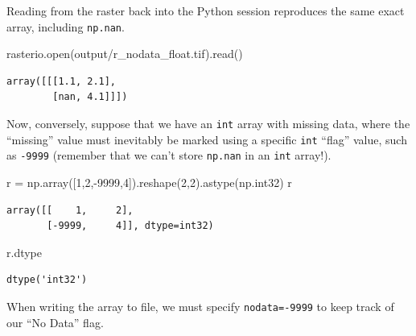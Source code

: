 \documentclass[
  letterpaper,
]{krantz}
\newenvironment{Shaded}{\begin{snugshade}}{\end{snugshade}}
\newcommand{\BuiltInTok}[1]{\textcolor[rgb]{0.00,0.23,0.31}{#1}}
\newcommand{\DecValTok}[1]{\textcolor[rgb]{0.68,0.00,0.00}{#1}}
\newcommand{\NormalTok}[1]{\textcolor[rgb]{0.00,0.23,0.31}{#1}}
\newcommand{\OperatorTok}[1]{\textcolor[rgb]{0.37,0.37,0.37}{#1}}
\newcommand{\StringTok}[1]{\textcolor[rgb]{0.13,0.47,0.30}{#1}}
\begin{document}
Reading from the raster back into the Python session reproduces the same
exact array, including \texttt{np.nan}.

\begin{Shaded}
\begin{Highlighting}[]
\NormalTok{rasterio.}\BuiltInTok{open}\NormalTok{(}\StringTok{\textquotesingle{}output/r\_nodata\_float.tif\textquotesingle{}}\NormalTok{).read()}
\end{Highlighting}
\end{Shaded}

\begin{verbatim}
array([[[1.1, 2.1],
        [nan, 4.1]]])
\end{verbatim}

Now, conversely, suppose that we have an \texttt{int} array with missing
data, where the ``missing'' value must inevitably be marked using a
specific \texttt{int} ``flag'' value, such as \texttt{-9999} (remember
that we can't store \texttt{np.nan} in an \texttt{int} array!).

\begin{Shaded}
\begin{Highlighting}[]
\NormalTok{r }\OperatorTok{=}\NormalTok{ np.array([}\DecValTok{1}\NormalTok{,}\DecValTok{2}\NormalTok{,}\OperatorTok{{-}}\DecValTok{9999}\NormalTok{,}\DecValTok{4}\NormalTok{]).reshape(}\DecValTok{2}\NormalTok{,}\DecValTok{2}\NormalTok{).astype(np.int32)}
\NormalTok{r}
\end{Highlighting}
\end{Shaded}

\begin{verbatim}
array([[    1,     2],
       [-9999,     4]], dtype=int32)
\end{verbatim}

\begin{Shaded}
\begin{Highlighting}[]
\NormalTok{r.dtype}
\end{Highlighting}
\end{Shaded}

\begin{verbatim}
dtype('int32')
\end{verbatim}

When writing the array to file, we must specify \texttt{nodata=-9999} to
keep track of our ``No Data'' flag.
\end{document}
